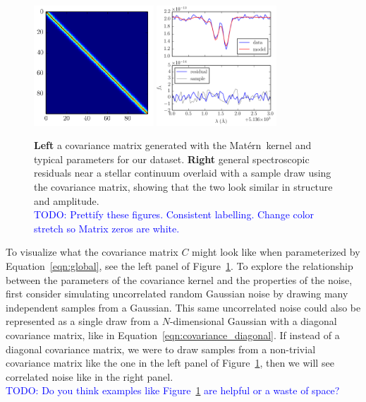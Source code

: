 \documentclass[iop,floatfix]{emulateapj}
\newcommand{\matern}{Mat\'{e}rn}
\newcommand{\todo}[1]{ \textcolor{Blue}{\\TODO: #1}}
\begin{document}
\begin{figure}[!htb]
\begin{center}
\includegraphics[width=0.4\textwidth]{figs/matern_matrix.png}
\includegraphics[width=0.4\textwidth]{figs/matern_draw.png}
\caption{\textbf{Left} a covariance matrix generated with the \matern\ kernel
 and typical parameters for our dataset.  
 \textbf{Right} general spectroscopic residuals near a stellar continuum
  overlaid with a sample draw using the covariance matrix, showing that the two
  look similar in structure and amplitude. 
  \protect \todo{Prettify these figures. Consistent labelling. Change
  color stretch so Matrix zeros are white.}}
\label{fig:matern}
\end{center}
\end{figure}

To visualize what the covariance matrix $C$ might look like when parameterized
 by Equation~\ref{eqn:global}, see the left panel of Figure~\ref{fig:matern}. 
To explore the relationship between the parameters of the covariance kernel and
 the properties of the noise, first consider simulating uncorrelated random
 Gaussian noise by drawing many independent samples from a Gaussian. 
This same uncorrelated noise could also be represented as a single draw from a
 $N$-dimensional Gaussian with a diagonal covariance matrix, like in
 Equation~\ref{eqn:covariance_diagonal}. 
If instead of a diagonal covariance matrix, we were to draw samples from a
 non-trivial covariance matrix like the one in the left panel of
 Figure~\ref{fig:matern}, then we will see correlated noise like in the right
 panel. 
\todo{Do you think examples like Figure~\ref{fig:matern} are helpful or a waste
 of space?}
\end{document}

